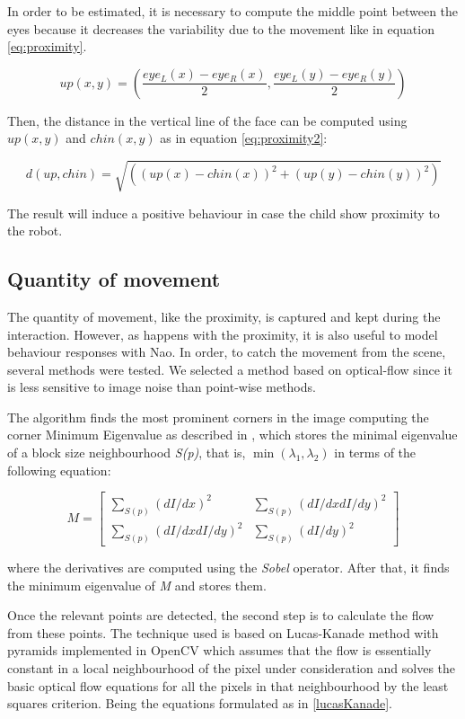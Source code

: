 In order to be estimated, it is necessary to compute the middle point between the eyes because it decreases the variability due to the movement like in equation \ref{eq:proximity}.

\begin{equation} \label{eq:proximity}
up(x,y) = \left (\frac{eye_{L}(x)-eye_{R}(x)}{2}, \frac{eye_{L}(y)-eye_{R}(y)}{2}\right )
\end{equation}

Then, the distance in the vertical line of the face can be computed using $ up(x,y) $ and $ chin(x,y) $ as in equation \ref{eq:proximity2}:

\begin{equation} \label{eq:proximity2}
d(up,chin) = \sqrt{({(up(x)-chin(x))}^2 + {(up(y)-chin(y))}^2)}
\end{equation}

The result will induce a positive behaviour in case the child show proximity to the robot.

\subsection{Quantity of movement}
The quantity of movement, like the proximity, is captured and kept during the interaction. However, as happens with the proximity, it is also useful to model behaviour responses with Nao. In order, to catch the movement from the scene, several methods were tested. We selected a method based on optical-flow since it is less sensitive to image noise than point-wise methods.

The algorithm finds the most prominent corners in the image computing the corner Minimum Eigenvalue as described in \cite{shi1994good}, which stores the minimal eigenvalue of a block size neighbourhood \textit{S(p)}, that is, $ \min(\lambda_1, \lambda_2) $ in terms of the following equation:

\begin{equation}
M =  \begin{bmatrix} 
		\sum _{S(p)}(dI/dx)^2 &  \sum _{S(p)}(dI/dx dI/dy)^2  \\ 
		\sum _{S(p)}(dI/dx dI/dy)^2 &  \sum _{S(p)}(dI/dy)^2 
	 \end{bmatrix}
\end{equation} 

where the derivatives are computed using the \textit{Sobel} operator. After that, it finds the minimum eigenvalue of \textit{M} and stores them.

Once the relevant points are detected, the second step is to calculate the flow from these points. The technique used is based on Lucas-Kanade method with pyramids implemented in OpenCV \cite{bouguet2001pyramidal} which assumes that the flow is essentially constant in a local neighbourhood of the pixel under consideration and solves the basic optical flow equations for all the pixels in that neighbourhood by the least squares criterion. Being the equations formulated as in \ref{lucasKanade}.


